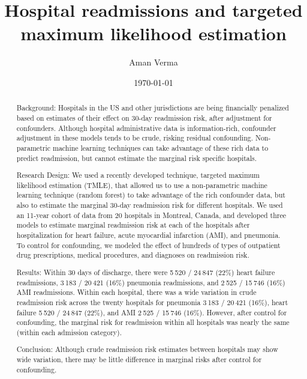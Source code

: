 \documentclass[]{article}\usepackage[]{graphicx}\usepackage[]{color}
\begin{document}
\title{Hospital readmissions and targeted maximum likelihood estimation}
\author{Aman Verma}
\date{\today}

\begin{abstract}








Background: Hospitals in the US and other jurisdictions are being financially penalized based on estimates of their effect on 30-day readmission risk, after adjustment for confounders. Although hospital administrative data is information-rich, confounder adjustment in these models tends to be crude, risking residual confounding. Non-parametric machine learning techniques can take advantage of these rich data to predict readmission, but cannot estimate the marginal risk specific hospitals.

Research Design: We used a recently developed technique, targeted maximum likelihood estimation (TMLE), that allowed us to use a non-parametric machine learning technique (random forest) to take advantage of the rich confounder data, but also to estimate the marginal 30-day readmission risk for different hospitals. We used an 11-year cohort of data from 20 hospitals in Montreal, Canada, and developed three models to estimate marginal readmission risk at each of the hospitals after hospitalization for heart failure, acute myocardial infarction (AMI), and pneumonia. To control for confounding, we modeled the effect of hundreds of types of outpatient drug prescriptions, medical procedures, and diagnoses on readmission risk.

Results: Within 30 days of discharge, there were 5 520 / 24 847 (22\%) heart failure readmissions, 3 183 / 20 421 (16\%) pneumonia readmissions, and 2 525 / 15 746 (16\%) AMI readmissions. Within each hospital, there was a wide variation in crude readmission risk across the twenty hospitals for pneumonia 3 183 / 20 421 (16\%), heart failure 5 520 / 24 847 (22\%), and AMI 2 525 / 15 746 (16\%). However, after control for confounding, the marginal risk for readmission within all hospitals was nearly the same (within each admission category).

Conclusion: Although crude readmission risk estimates between hospitals may show wide variation, there may be little difference in marginal risks after control for confounding.

\end{abstract}
\end{document}
